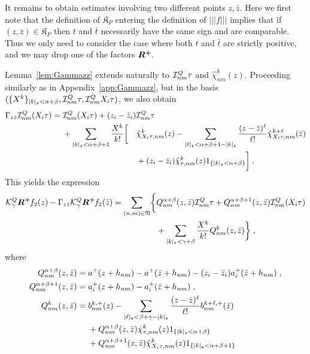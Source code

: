 \documentclass[reqno,11pt]{article}
\def\Rplus{\boldsymbol{R^+}\hspace{-.1em}}
\def\normDgamma#1{|\!|\!|#1|\!|\!|}
\def\fraK{\mathfrak{K}}
\def\abss#1{\abs{#1}_\mathfrak{s}}
\newcommand{\setnm}{\mathfrak{N}}
\newcommand{\sumnm}{\sum_{(n,m)\in\setnm}}
\begin{document}
It remains to obtain estimates involving two different points $z,\bar z$.
Here we first note that the definition of $\fraK_P$ entering the
definition of $\normDgamma{f}$ implies that if $(z,\bar z)\in\fraK_P$ then $t$
and $\bar t$ necessarily have the same sign and are comparable. Thus we only 
need to consider the case where both $t$ and $\bar t$ are strictly positive, 
and we may drop one of the factors $\Rplus$. 

Lemma~\ref{lem:Gammazz} extends naturally to ${\mathcal I}^Q_{nm}\tau$ and 
$\hat\chi^k_{nm}(z)$. Proceeding similarly as in Appendix~\ref{app:Gammazz}, 
but in the basis 
$(\set{X^k}_{\abss{k}<\alpha+\beta},\cI^Q_{nm}\tau,\cI^Q_{nm}X_i\tau)$, we 
also obtain 
\begin{alignat}{2}
\nonumber
\Gamma_{z\bar z}\cI^Q_{nm}(X_i\tau) 
={}& 
\cI^Q_{nm}(X_i\tau) + (z_i -\bar z_i)\cI^Q_{nm}\tau \span\span \\
\nonumber
&{}+ 
\sum_{\abss{k}<\alpha+\beta+1} \frac{X^k}{k!} 
\biggl[ &&\hat\chi^k_{X_i\tau,nm}(z) - 
\sum_{\abss{\ell}<\alpha+\beta+1-\abss{k}}\frac{(z-\bar z)^\ell}{\ell!}
\hat\chi^{k+\ell}_{X_i\tau,nm}(\bar z) \\
&&& 
+ (z_i-\bar z_i) \hat\chi^k_{\tau,nm}(z) \indexfct{\abss{k}<\alpha+\beta}
\biggr]\;.
\end{alignat}
This yields the expression 
\begin{align}
\nonumber
\cK^Q_\gamma\Rplus f_2(z) - \Gamma_{z\bar z}\cK^Q_\gamma\Rplus
f_2(\bar z) 
= \sumnm \biggl\{&Q^{\alpha+\beta}_{nm}(z,\bar z)\cI^Q_{nm}\tau 
+ Q^{\alpha+\beta+1}_{nm}(z,\bar z)\cI^Q_{nm}(X_i\tau) \\
&+ \sum_{\abss{k} < \gamma+\beta} \frac{X^k}{k!}Q^k_{nm}(z,\bar z)
\biggr\}\;, 
\end{align} 
where 
\begin{align}
\nonumber
Q^{\alpha+\beta}_{nm}(z,\bar z) ={}& a^+(z+h_{nm}) - a^+(\bar z+h_{nm})
- (z_i-\bar z_i)a^+_i(\bar z+h_{nm})\;, \\
\nonumber
Q^{\alpha+\beta+1}_{nm}(z,\bar z) ={}& a^+_i(z+h_{nm}) 
- a^+_i(\bar z+h_{nm})\;, \\
\nonumber
Q^k_{nm}(z,\bar z) ={}&  
b^{k,+}_{nm}(z) - \sum_{\abss{\ell} < \beta+\gamma-\abss{k}} 
\frac{(z-\bar z)^\ell}{\ell!} b^{k+\ell,+}_{nm}(\bar z) \\
\nonumber
&{}+ Q^{\alpha+\beta}_{nm}(z,\bar z)
\hat\chi^k_{\tau,nm}(z) \indexfct{\abss{k} < \alpha+\beta} \\
&{}+ Q^{\alpha+\beta+1}_{nm}(z,\bar z)
\hat\chi^k_{X_i\tau,nm}(z) \indexfct{\abss{k} < \alpha+\beta+1}
\end{align}
\end{document}
